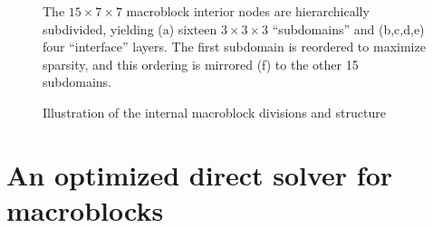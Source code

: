 \begin{figure}
\centering
{}


\caption{Illustration of the internal macroblock divisions and
  structure}{The $15\!\times\!7\!\times\!7$ macroblock interior nodes
  are hierarchically subdivided, yielding (a) sixteen
  $3\!\times\!3\!\times\!3$ ``subdomains'' and (b,c,d,e) four
  ``interface'' layers. The first subdomain is reordered to maximize
  sparsity, and this ordering is mirrored (f) to the other 15
  subdomains.}
\label{fig:macroblocks:structure}


\end{figure}

\section{An optimized direct solver for macroblocks}
\label{sec:macroblocks:local-solver}

